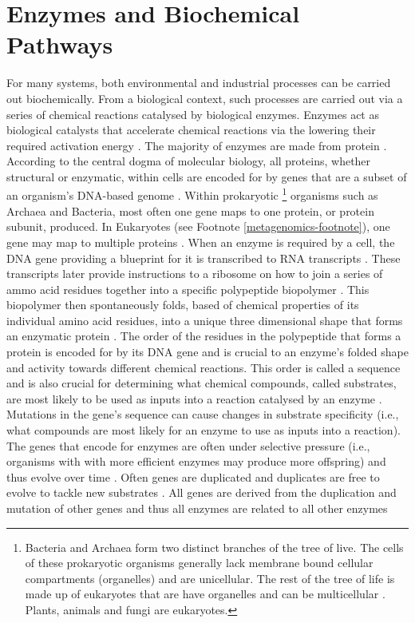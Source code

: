 \section{Enzymes and Biochemical Pathways} \label{enzymes-and-pathways}

For many systems, both environmental and industrial processes can be carried out biochemically. From a biological context, such processes are carried out via a series of chemical reactions catalysed by biological enzymes. Enzymes act as biological catalysts that accelerate chemical reactions via the lowering their required activation energy \cite{segel1975enzyme}. The majority of enzymes are made from protein \cite{kruger1982self}. According to the central dogma of molecular biology, all proteins, whether structural or enzymatic, within cells are encoded for by genes that are a subset of an organism's DNA-based genome \cite{crick1970central}. Within prokaryotic \footnote{Bacteria and Archaea form two distinct branches of the tree of live. The cells of these prokaryotic organisms generally \cite{nevo2007thylakoid,cameron2013biogenesis,bazylinski2004magnetosome,van2008combined,adams2000heterocyst,o2000biofilm} lack membrane bound cellular compartments (organelles) and are unicellular. The rest of the tree of life is made up of eukaryotes that are have organelles and can be multicellular \cite{baldauf2003deep}. Plants, animals and fungi are eukaryotes.} organisms such as Archaea and Bacteria, most often one gene maps to one protein, or protein subunit, produced. In Eukaryotes (see Footnote \ref{metagenomics-footnote}), one gene may map to multiple proteins \cite{black2003mechanisms}. When an enzyme is required by a cell, the DNA gene providing a blueprint for it is transcribed to RNA transcripts \cite{crick1970central}. These transcripts later provide instructions to a ribosome on how to join a series of ammo acid residues together into a specific polypeptide biopolymer \cite{crick1970central}. This biopolymer then spontaneously folds, based of chemical properties of its individual amino acid residues, into a unique three dimensional shape that forms an enzymatic protein \cite{fersht1992folding}. The order of the residues in the polypeptide that forms a protein is encoded for by its DNA gene and is crucial to an enzyme's folded shape and activity towards different chemical reactions. This order is called a sequence and is also crucial for determining what chemical compounds, called substrates, are most likely to be used as inputs into a reaction catalysed by an enzyme \cite{fersht1992folding,fersht1999structure}. Mutations in the gene's sequence can cause changes in substrate specificity (i.e., what compounds are most likely for an enzyme to use as inputs into a reaction). The genes that encode for enzymes are often under selective pressure (i.e., organisms with with more efficient enzymes may produce more offspring) and thus evolve over time \cite{zhang2003evolution,whelan2001general}. Often genes are duplicated and duplicates are free to evolve to tackle new substrates \cite{zhang2003evolution}. All genes are derived from the duplication and mutation of other genes and thus all enzymes are related to all other enzymes 
